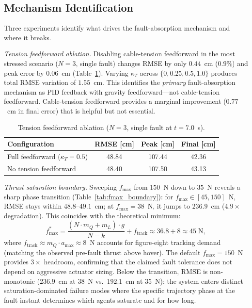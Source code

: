 \subsection{Mechanism Identification}
\label{sec:tension_ablation}

Three experiments identify what drives the fault-absorption mechanism and where it breaks.

\emph{Tension feedforward ablation.}\label{sec:fmax_boundary}
Disabling cable-tension feedforward in the most stressed scenario ($N{=}3$, single fault) changes RMSE by only $0.44$~cm ($0.9\%$) and peak error by $0.06$~cm (Table~\ref{tab:tension_ablation}). Varying $\kappa_T$ across $\{0, 0.25, 0.5, 1.0\}$ produces total RMSE variation of $1.55$~cm. This identifies the \emph{primary} fault-absorption mechanism as PID feedback with gravity feedforward---not cable-tension feedforward. Cable-tension feedforward provides a marginal improvement ($0.77$~cm in final error) that is helpful but not essential.

\begin{table}[t]
\centering
\caption{Tension feedforward ablation ($N{=}3$, single fault at $t = 7.0$~s).}
\label{tab:tension_ablation}
\begin{tabular}{lccc}
\toprule
Configuration & RMSE [cm] & Peak [cm] & Final [cm] \\
\midrule
Full feedforward ($\kappa_T = 0.5$) & 48.84 & 107.44 & 42.36 \\
No tension feedforward              & 48.40 & 107.50 & 43.13 \\
\bottomrule
\end{tabular}
\end{table}

\emph{Thrust saturation boundary.}
Sweeping $f_{\max}$ from $150$~N down to $35$~N reveals a sharp phase transition (Table~\ref{tab:fmax_boundary}): for $f_{\max} \in [45, 150]$~N, RMSE stays within $48.8$--$49.1$~cm; at $f_{\max} = 38$~N, it jumps to $236.9$~cm ($4.9\times$ degradation). This coincides with the theoretical minimum:
\begin{equation}\label{eq:fmax_critical}
  f_{\max}^* = \frac{(N \cdot m_Q + m_L) \cdot g}{N - k} + f_{\mathrm{track}} \approx 36.8 + 8 \approx 45\;\text{N},
\end{equation}
where $f_{\mathrm{track}} \approx m_Q \cdot a_{\max} \approx 8$~N accounts for figure-eight tracking demand (matching the observed pre-fault thrust above hover). The default $f_{\max} = 150$~N provides $3\times$ headroom, confirming that the claimed fault tolerance does not depend on aggressive actuator sizing. Below the transition, RMSE is non-monotonic ($236.9$~cm at $38$~N vs.\ $192.1$~cm at $35$~N): the system enters distinct saturation-dominated failure modes where the specific trajectory phase at the fault instant determines which agents saturate and for how long.

